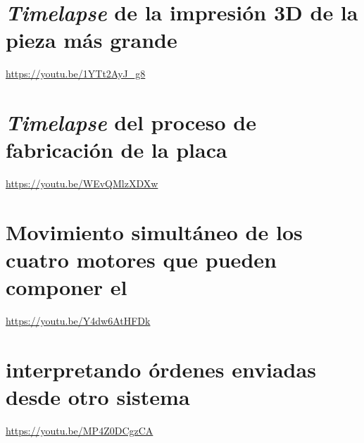 \section*{\textit{Timelapse} de la impresión 3D de la pieza más grande}
\begin{center}
    \url{https://youtu.be/1YTt2AyJ_g8} \qquad {}
\end{center}

\section*{\textit{Timelapse} del proceso de fabricación de la placa}
\begin{center}
    \url{https://youtu.be/WEvQMlzXDXw} \qquad {}
\end{center}

\section*{Movimiento simultáneo de los cuatro motores que pueden componer el \pArm{}}
\begin{center}
    \url{https://youtu.be/Y4dw6AtHFDk} \qquad {}
\end{center}

\section*{\pArm{} interpretando órdenes enviadas desde otro sistema}
\begin{center}
    \url{https://youtu.be/MP4Z0DCgzCA} \qquad {}
\end{center}
